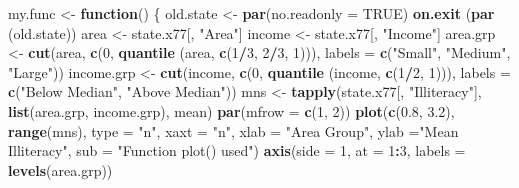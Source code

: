 \documentclass[
]{book}
\newenvironment{Shaded}{\begin{snugshade}}{\end{snugshade}}
\newcommand{\AttributeTok}[1]{\textcolor[rgb]{0.13,0.29,0.53}{#1}}
\newcommand{\ConstantTok}[1]{\textcolor[rgb]{0.56,0.35,0.01}{#1}}
\newcommand{\ControlFlowTok}[1]{\textcolor[rgb]{0.13,0.29,0.53}{\textbf{#1}}}
\newcommand{\DecValTok}[1]{\textcolor[rgb]{0.00,0.00,0.81}{#1}}
\newcommand{\FloatTok}[1]{\textcolor[rgb]{0.00,0.00,0.81}{#1}}
\newcommand{\FunctionTok}[1]{\textcolor[rgb]{0.13,0.29,0.53}{\textbf{#1}}}
\newcommand{\NormalTok}[1]{#1}
\newcommand{\OtherTok}[1]{\textcolor[rgb]{0.56,0.35,0.01}{#1}}
\newcommand{\SpecialCharTok}[1]{\textcolor[rgb]{0.81,0.36,0.00}{\textbf{#1}}}
\newcommand{\StringTok}[1]{\textcolor[rgb]{0.31,0.60,0.02}{#1}}
\begin{document}
\begin{Shaded}
\begin{Highlighting}[]
\NormalTok{my.func }\OtherTok{\textless{}{-}} \ControlFlowTok{function}\NormalTok{()}
\NormalTok{\{ old.state }\OtherTok{\textless{}{-}} \FunctionTok{par}\NormalTok{(}\AttributeTok{no.readonly =} \ConstantTok{TRUE}\NormalTok{)}
  \FunctionTok{on.exit}\NormalTok{ (}\FunctionTok{par}\NormalTok{ (old.state))}
\NormalTok{  area }\OtherTok{\textless{}{-}}\NormalTok{ state.x77[, }\StringTok{"Area"}\NormalTok{]}
\NormalTok{  income }\OtherTok{\textless{}{-}}\NormalTok{ state.x77[, }\StringTok{"Income"}\NormalTok{]}
\NormalTok{  area.grp }\OtherTok{\textless{}{-}} \FunctionTok{cut}\NormalTok{(area, }\FunctionTok{c}\NormalTok{(}\DecValTok{0}\NormalTok{, }\FunctionTok{quantile}\NormalTok{ (area, }\FunctionTok{c}\NormalTok{(}\DecValTok{1}\SpecialCharTok{/}\DecValTok{3}\NormalTok{, }\DecValTok{2}\SpecialCharTok{/}\DecValTok{3}\NormalTok{, }\DecValTok{1}\NormalTok{))),}
                  \AttributeTok{labels =} \FunctionTok{c}\NormalTok{(}\StringTok{"Small"}\NormalTok{, }\StringTok{"Medium"}\NormalTok{, }\StringTok{"Large"}\NormalTok{))}
\NormalTok{  income.grp }\OtherTok{\textless{}{-}} \FunctionTok{cut}\NormalTok{(income, }\FunctionTok{c}\NormalTok{(}\DecValTok{0}\NormalTok{, }\FunctionTok{quantile}\NormalTok{ (income, }\FunctionTok{c}\NormalTok{(}\DecValTok{1}\SpecialCharTok{/}\DecValTok{2}\NormalTok{, }\DecValTok{1}\NormalTok{))),}
                    \AttributeTok{labels =} \FunctionTok{c}\NormalTok{(}\StringTok{"Below Median"}\NormalTok{, }\StringTok{"Above Median"}\NormalTok{))}
\NormalTok{  mns }\OtherTok{\textless{}{-}} \FunctionTok{tapply}\NormalTok{(state.x77[, }\StringTok{"Illiteracy"}\NormalTok{], }\FunctionTok{list}\NormalTok{(area.grp, income.grp), mean)}
  \FunctionTok{par}\NormalTok{(}\AttributeTok{mfrow =} \FunctionTok{c}\NormalTok{(}\DecValTok{1}\NormalTok{, }\DecValTok{2}\NormalTok{))}
  \FunctionTok{plot}\NormalTok{(}\FunctionTok{c}\NormalTok{(}\FloatTok{0.8}\NormalTok{, }\FloatTok{3.2}\NormalTok{), }\FunctionTok{range}\NormalTok{(mns), }\AttributeTok{type =} \StringTok{"n"}\NormalTok{, }\AttributeTok{xaxt =} \StringTok{"n"}\NormalTok{, }\AttributeTok{xlab =} \StringTok{"Area Group"}\NormalTok{, }
       \AttributeTok{ylab =}\StringTok{"Mean Illiteracy"}\NormalTok{, }\AttributeTok{sub =} \StringTok{"Function plot() used"}\NormalTok{)}
  \FunctionTok{axis}\NormalTok{(}\AttributeTok{side =} \DecValTok{1}\NormalTok{, }\AttributeTok{at =} \DecValTok{1}\SpecialCharTok{:}\DecValTok{3}\NormalTok{, }\AttributeTok{labels =} \FunctionTok{levels}\NormalTok{(area.grp))}

\end{Highlighting}
\end{Shaded}
\end{document}

